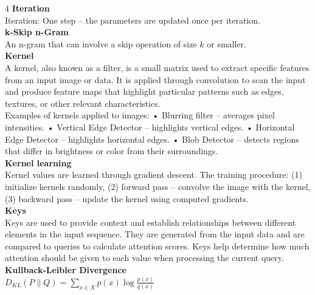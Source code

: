 \documentclass[8pt]{extarticle}
\begin{document}
\begin{multicols}{4}
\vspace{2pt}\textbf{Iteration}\\
Iteration: One step – the parameters are updated once per iteration.\\
\vspace{2pt}\textbf{k-Skip n-Gram}\\
An n-gram that can involve a skip operation of size $k$ or smaller.\\
\vspace{2pt}\textbf{Kernel}\\
A kernel, also known as a filter, is a small matrix used to extract specific features from an input image or data. It is applied through convolution to scan the input and produce feature maps that highlight particular patterns such as edges, textures, or other relevant characteristics.\\
Examples of kernels applied to images: • Blurring filter – averages pixel intensities. • Vertical Edge Detector – highlights vertical edges. • Horizontal Edge Detector – highlights horizontal edges. • Blob Detector – detects regions that differ in brightness or color from their surroundings.\\
\vspace{2pt}\textbf{Kernel learning}\\
Kernel values are learned through gradient descent. The training procedure: (1) initialize kernels randomly, (2) forward pass – convolve the image with the kernel, (3) backward pass – update the kernel using computed gradients.\\
\vspace{2pt}\textbf{Keys}\\
Keys are used to provide context and establish relationships between different elements in the input sequence. They are generated from the input data and are compared to queries to calculate attention scores. Keys help determine how much attention should be given to each value when processing the current query.\\
\vspace{2pt}\textbf{Kullback-Leibler Divergence}\\
$D_{KL}(P\|Q) = \sum_{x \in X} p(x) \log \frac{p(x)}{q(x)}$\\


\end{multicols}
\end{document}
